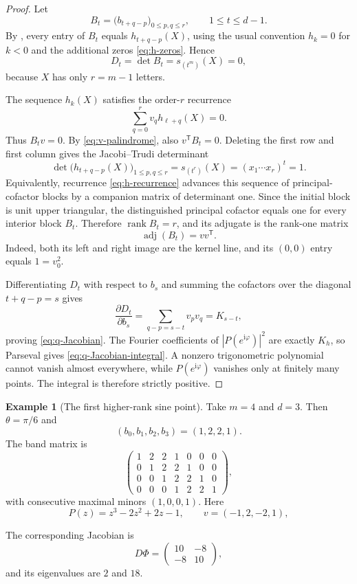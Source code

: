 \documentclass[11pt]{amsart}
\theoremstyle{definition}
\newtheorem{example}[theorem]{Example}
\theoremstyle{remark}
\newcommand{\rank}{\operatorname{rank}}
\newcommand{\adj}{\operatorname{adj}}
\begin{document}
\begin{proof}
Let
\[
 B_t=\bigl(b_{t+q-p}\bigr)_{0\le p,q\le r},
 \qquad 1\le t\le d-1.
\]
By , every entry of $B_t$ equals $h_{t+q-p}(X)$, using the usual convention $h_k=0$ for $k<0$ and the additional zeros \eqref{eq:h-zeros}.  Hence
\[
 D_t=\det B_t=s_{(t^m)}(X)=0,
\]
because $X$ has only $r=m-1$ letters.

The sequence $h_k(X)$ satisfies the order-$r$ recurrence
\begin{equation}\label{eq:h-recurrence}
 \sum_{q=0}^rv_qh_{\ell+q}(X)=0.
\end{equation}
Thus $B_tv=0$.  By \eqref{eq:v-palindrome}, also $v^{\mathsf T}B_t=0$.  Deleting the first row and first column gives the Jacobi--Trudi determinant
\[
 \det\bigl(h_{t+q-p}(X)\bigr)_{1\le p,q\le r}
 =s_{(t^r)}(X)
 =(x_1\cdots x_r)^t=1.
\]
Equivalently, recurrence \eqref{eq:h-recurrence} advances this sequence of principal-cofactor blocks by a companion matrix of determinant one.  Since the initial block is unit upper triangular, the distinguished principal cofactor equals one for every interior block $B_t$.
Therefore $\rank B_t=r$, and its adjugate is the rank-one matrix
\begin{equation}\label{eq:adj-vv}
 \adj(B_t)=vv^{\mathsf T}.
\end{equation}
Indeed, both its left and right image are the kernel line, and its $(0,0)$ entry equals $1=v_0^2$.

Differentiating $D_t$ with respect to $b_s$ and summing the cofactors over the diagonal $t+q-p=s$ gives
\[
 \frac{\partial D_t}{\partial b_s}
 =\sum_{q-p=s-t}v_pv_q=K_{s-t},
\]
proving \eqref{eq:q-Jacobian}.  The Fourier coefficients of $|P(e^{\mathrm i\varphi})|^2$ are exactly $K_h$, so Parseval gives \eqref{eq:q-Jacobian-integral}.  A nonzero trigonometric polynomial cannot vanish almost everywhere, while $P(e^{\mathrm i\varphi})$ vanishes only at finitely many points.  The integral is therefore strictly positive.
\end{proof}

\begin{example}[The first higher-rank sine point]\label{ex:m4}
Take $m=4$ and $d=3$.  Then $\theta=\pi/6$ and
\[
 (b_0,b_1,b_2,b_3)=(1,2,2,1).
\]
The band matrix is
\[
 \begin{pmatrix}
 1&2&2&1&0&0&0\\
 0&1&2&2&1&0&0\\
 0&0&1&2&2&1&0\\
 0&0&0&1&2&2&1
 \end{pmatrix},
\]
with consecutive maximal minors $(1,0,0,1)$.  Here
\[
 P(z)=z^3-2z^2+2z-1,
 \qquad v=(-1,2,-2,1),
\]
\begin{samepage}
The corresponding Jacobian is
\[
 D\Phi=\begin{pmatrix}10&-8\\-8&10\end{pmatrix},
\]
and its eigenvalues are $2$ and $18$.
\end{samepage}
\end{example}
\end{document}
